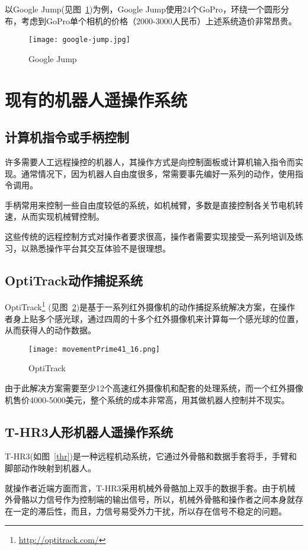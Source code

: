 以Google Jump(见图~\ref{jump})为例，Google Jump使用24个GoPro，环绕一个圆形分布，考虑到GoPro单个相机的价格（2000-3000人民币）上述系统造价非常昂贵。

\begin{figure}[htbp]
\small
\centering
\texttt{[image: google-jump.jpg]}
\caption{Google Jump} 
\label{jump}
\end{figure}

\section{现有的机器人遥操作系统}

\subsection{计算机指令或手柄控制}
许多需要人工远程操控的机器人，其操作方式是向控制面板或计算机输入指令而实现。通常情况下，因为机器人自由度很多，常需要事先编好一系列的动作，使用指令调用。

手柄常用来控制一些自由度较低的系统，如机械臂，多数是直接控制各关节电机转速，从而实现机械臂控制。

这些传统的远程控制方式对操作者要求很高，操作者需要实现接受一系列培训及练习，以熟悉操作平台其交互体验不是很理想。

\subsection{OptiTrack动作捕捉系统}
OptiTrack\footnote{\url{http://optitrack.com/}} (见图~\ref{opti})是基于一系列红外摄像机的动作捕捉系统解决方案，在操作者身上贴多个感光球，通过四周的十多个红外摄像机来计算每一个感光球的位置，从而获得人的动作数据。
\begin{figure}[H]
\small
\centering
\texttt{[image: movementPrime41\_16.png]}
\caption{OptiTrack} 
\label{opti}
\end{figure}
由于此解决方案需要至少12个高速红外摄像机和配套的处理系统，而一个红外摄像机售价4000-5000美元，整个系统的成本非常高，用其做机器人控制并不现实。

\subsection{T-HR3人形机器人遥操作系统}

T-HR3(如图~\ref{thr})是一种远程机动系统，它通过外骨骼和数据手套将手，手臂和脚部动作映射到机器人。

就操作者近端方面而言，T-HR3采用机械外骨骼加上双手的数据手套。由于机械外骨骼以力信号作为控制端的输出信号，所以，机械外骨骼和操作者之间本身就存在一定的滞后性，而且，力信号易受外力干扰，所以存在信号不稳定的问题。

